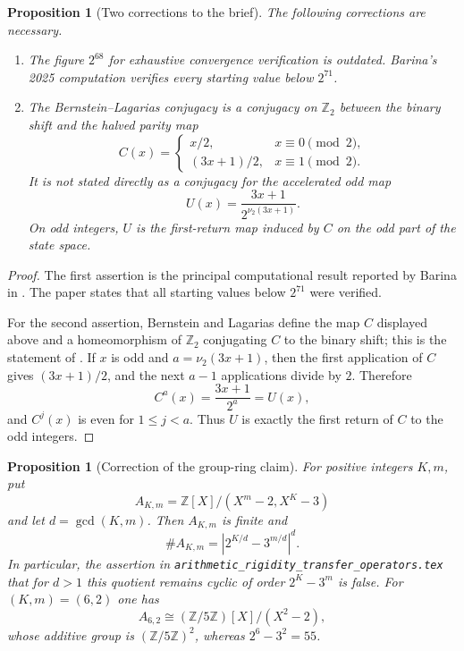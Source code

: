 \documentclass[11pt]{article}
\newtheorem{proposition}[theorem]{Proposition}
\theoremstyle{definition}
\theoremstyle{remark}
\newcommand{\Z}{\mathbb{Z}}
\begin{document}
\begin{proposition}[Two corrections to the brief]
\label{prop:brief-corrections}
The following corrections are necessary.

\begin{enumerate}
\item The figure $2^{68}$ for exhaustive convergence verification is outdated. Barina's 2025 computation verifies every starting value below $2^{71}$.
\item The Bernstein--Lagarias conjugacy is a conjugacy on $\Z_2$ between the binary shift and the halved parity map
\[
C(x)=
\begin{cases}
x/2,&x\equiv 0\pmod 2,\\
(3x+1)/2,&x\equiv 1\pmod 2.
\end{cases}
\]
It is not stated directly as a conjugacy for the accelerated odd map
\[
U(x)=\frac{3x+1}{2^{\nu_2(3x+1)}}.
\]
On odd integers, $U$ is the first-return map induced by $C$ on the odd part of the state space.
\end{enumerate}
\end{proposition}

\begin{proof}
The first assertion is the principal computational result reported by Barina in \cite{Barina2025}. The paper states that all starting values below $2^{71}$ were verified.

For the second assertion, Bernstein and Lagarias define the map $C$ displayed above and a homeomorphism of $\Z_2$ conjugating $C$ to the binary shift; this is the statement of \cite{BernsteinLagarias}. If $x$ is odd and $a=\nu_2(3x+1)$, then the first application of $C$ gives $(3x+1)/2$, and the next $a-1$ applications divide by $2$. Therefore
\[
C^a(x)=\frac{3x+1}{2^a}=U(x),
\]
and $C^j(x)$ is even for $1\le j<a$. Thus $U$ is exactly the first return of $C$ to the odd integers.
\end{proof}

\begin{proposition}[Correction of the group-ring claim]
\label{prop:resultant-correction}
For positive integers $K,m$, put
\[
A_{K,m}=\Z[X]/(X^m-2,X^K-3)
\]
and let $d=\gcd(K,m)$. Then $A_{K,m}$ is finite and
\[
\#A_{K,m}=\left|2^{K/d}-3^{m/d}\right|^d.
\]
In particular, the assertion in \texttt{arithmetic\_rigidity\_transfer\_operators.tex} that for $d>1$ this quotient remains cyclic of order $2^K-3^m$ is false. For $(K,m)=(6,2)$ one has
\[
A_{6,2}\cong (\Z/5\Z)[X]/(X^2-2),
\]
whose additive group is $(\Z/5\Z)^2$, whereas $2^6-3^2=55$.
\end{proposition}
\end{document}
